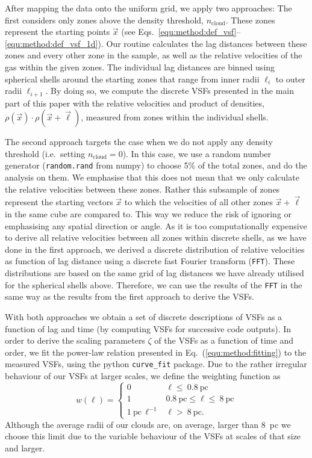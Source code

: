 After mapping the data onto the uniform grid, we apply two approaches: 
The first considers only zones above the density threshold, $n_\mathrm{cloud}$.
These zones represent the starting points $\vec{x}$ (see Eqs.~\ref{equ:method:def_vsf}--\ref{equ:method:def_vsf_1d}).
Our routine calculates the lag distances between these zones and every other zone in the sample, as well as the relative velocities of the gas within the given zones. 
The individual lag distances are binned using spherical shells around the starting zones that range from inner radii $\ell_{i}$ to outer radii $\ell_{i+1}$. 
By doing so, we compute the discrete VSFs presented in the main part of this paper with the relative velocities and product of densities, $\rho(\vec{x}) \cdot \rho(\vec{x}+\vec{\ell})$, measured from zones within the individual shells.

The second approach targets the case when we do not apply any density threshold (i.e.~setting $n_\mathrm{cloud} =0$).
In this case, we use a random number generator (\texttt{random.rand} from numpy) to choose 5\% of the total zones, and do the analysis on them.
We emphasise that this does not mean that we only calculate the relative velocities between these zones. Rather this subsample of zones represent the starting vectors $\vec{x}$ to which the velocities of all other zones $\vec{x} + \vec{\ell}$ in the same cube are compared to. This way we reduce the risk of ignoring or emphasising any spatial direction or angle.
As it is too computationally expensive to derive all relative velocities between all zones within discrete shells, as we have done in the first approach, we derived a discrete distribution of relative velocities as function of lag distance using a discrete fast Fourier transform (\texttt{FFT}). 
These distributions are based on the same grid of lag distances we have already utilised for the spherical shells above.
Therefore, we can use the results of the \texttt{FFT} in the same way as the results from the first approach to derive the VSFs.

With both approaches we obtain a set of discrete descriptions of VSFs as a function of  lag  and time (by computing VSFs for successive code outputs).
In order to derive the scaling parameters $\zeta$ of the VSFs as a function of time and order, we fit the power-law relation presented in Eq.~(\ref{equ:method:fitting}) to the measured VSFs, using the python \texttt{curve\_fit} package.
Due to the rather irregular behaviour of our VSFs at larger scales, we define the weighting function as
\begin{equation}
w\left(\ell\right) = \begin{cases}
    0 & \ell \leq~\mathrm{0.8~pc} \\
    1 & \mathrm{0.8~pc} \leq \ell \leq~\mathrm{8~pc} \\
    \mathrm{1~pc}\,\ell^{-1} & \ell >~\mathrm{8~pc}.
\end{cases}
\end{equation}
\noindent Although the average radii of our clouds are, on average, larger than 8~pc we choose this limit due to the variable behaviour of the VSFs at scales of that size and larger.

